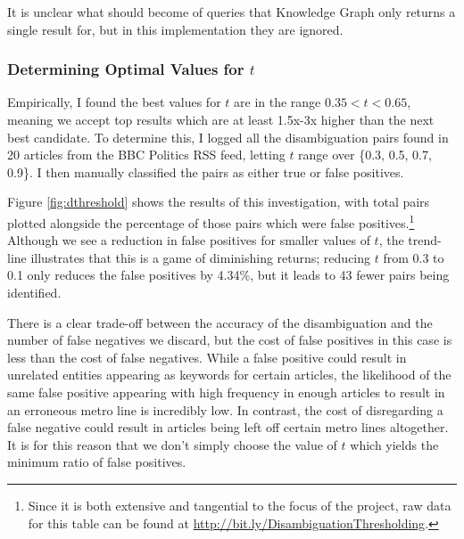 It is unclear what should become of queries that Knowledge Graph only returns a single result for, but in this implementation they are ignored.

\subsubsection{Determining Optimal Values for $t$}

Empirically, I found the best values for $t$ are in the range $0.35 < t < 0.65$, meaning we accept top results which are at least 1.5x-3x higher than the next best candidate. To determine this, I logged all the disambiguation pairs found in 20 articles from the BBC Politics RSS feed, letting $t$ range over \{0.3, 0.5, 0.7, 0.9\}. I then manually classified the pairs as either true or false positives. 

Figure \ref{fig:dthreshold} shows the results of this investigation, with total pairs plotted alongside the percentage of those pairs which were false positives.\footnote{Since it is both extensive and tangential to the focus of the project, raw data for this table can be found at \url{http://bit.ly/DisambiguationThresholding}.} Although we see a reduction in false positives for smaller values of $t$, the trend-line illustrates that this is a game of diminishing returns; reducing $t$ from 0.3 to 0.1 only reduces the false positives by 4.34\%, but it leads to 43 fewer pairs being identified. 

There is a clear trade-off between the accuracy of the disambiguation and the number of false negatives we discard, but the cost of false positives in this case is less than the cost of false negatives. While a false positive could result in unrelated entities appearing as keywords for certain articles, the likelihood of the same false positive appearing with high frequency in enough articles to result in an erroneous metro line is incredibly low. In contrast, the cost of disregarding a false negative could result in articles being left off certain metro lines altogether. It is for this reason that we don't simply choose the value of $t$ which yields the minimum ratio of false positives.

